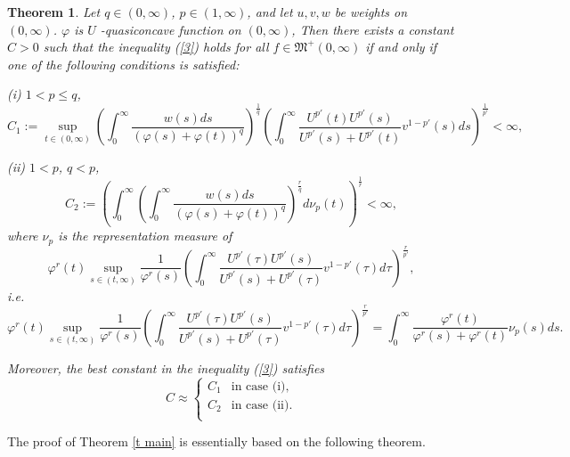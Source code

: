 \documentclass[12pt]{article}
\newtheorem{theorem}{\indent Theorem}
\begin{document}
\begin{theorem} \label{t main}
Let  $q\in(0,\infty)$, $p\in(1,\infty)$, and let $u, v, w$ be weights on $(0,\infty)$. $\varphi$ is $U$ -quasiconcave function on $(0, \infty)$, Then there exists a constant $C>0$ such that the inequality (\ref{3}) holds for all $f\in \mathfrak{M}^+(0,\infty)$  if and only if one of the following conditions is satisfied:

\rm(i) $1 < p \le q $,
\begin{equation*}
C_1 :=  \sup_{ t \in (0, \infty)} \left(\int_0^\infty \frac{w(s)ds}{(\varphi(s)+\varphi(t))^q}\right)^{\frac{1}{q}} \left(\int_0^\infty \frac{ U^{p'}(t) U^{p'}(s)}{ U^{p'}(s) +U^{p'}(t)} v^{1-p'}(s)ds \right)^{\frac{1}{p'}}<\infty,
\end{equation*}

\rm(ii)  $1<p$, $q<p$,
\begin{equation*}
C_2 :=  \left(\int_0^\infty \left(\int_0^\infty \frac{w(s)ds}{(\varphi(s)+\varphi(t))^q}\right)^{\frac{r}{q}}d\nu_p(t)\right)^{\frac{1}{r}}<\infty,
\end{equation*}
where $\nu_p$ is the representation measure of
\[
\varphi^r(t)\sup_{s\in(t,\infty)}\frac{1}{\varphi^r(s)}\left(\int_0^\infty \frac{ U^{p'}(\tau) U^{p'}(s)}{ U^{p'}(s) +U^{p'}(\tau)} v^{1-p'}(\tau)d\tau \right)^{\frac{r}{p'}},\]
i.e.
\[ \varphi^r(t)\sup_{s\in(t,\infty)}\frac{1}{\varphi^r(s)}\left(\int_0^\infty \frac{ U^{p'}(\tau) U^{p'}(s)}{ U^{p'}(s) +U^{p'}(\tau)} v^{1-p'}(\tau)d\tau \right)^{\frac{r}{p'}} =
\int_0^\infty \frac{\varphi^r(t)}{\varphi^{r}(s) +\varphi^{r}(t)} \nu_p(s)ds.
\]

Moreover, the best constant in the inequality (\ref{3}) satisfies
\begin{displaymath}
C\approx \left\{ \begin{array}{ll}
C_1 & \textrm{in case  (i),}\\
C_2 & \textrm{in case  (ii).}\\
\end{array} \right.
\end{displaymath}
\end{theorem}

The proof of Theorem \eqref{t main} is essentially based on the following theorem.
\end{document}
